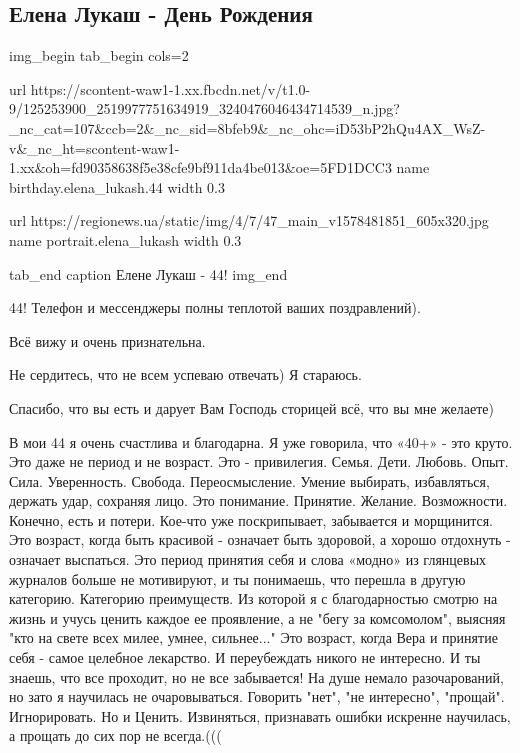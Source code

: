  
 
 

\subsection{Елена Лукаш - День Рождения}

\ifcmt
img_begin 
  tab_begin cols=2

    url https://scontent-waw1-1.xx.fbcdn.net/v/t1.0-9/125253900_2519977751634919_3240476046434714539_n.jpg?_nc_cat=107&ccb=2&_nc_sid=8bfeb9&_nc_ohc=iD53bP2hQu4AX_WsZ-v&_nc_ht=scontent-waw1-1.xx&oh=fd90358638f5e38cfe9bf911da4be013&oe=5FD1DCC3
    name birthday.elena_lukash.44
    width 0.3

    url https://regionews.ua/static/img/4/7/47_main_v1578481851_605x320.jpg
    name portrait.elena_lukash
    width 0.3

  tab_end
  caption Елене Лукаш - 44!
img_end
\fi

44!
\obeycr
Телефон и мессенджеры полны теплотой ваших поздравлений). 

Всё вижу и очень признательна.

Не сердитесь, что не всем успеваю отвечать) Я стараюсь. 

Спасибо, что вы есть и дарует Вам Господь сторицей всё, что вы мне желаете)  

В мои 44 я очень счастлива и благодарна.
Я уже говорила, что «40+» - это круто. 
Это даже не период и не возраст. 
Это - привилегия. 
Семья. Дети. Любовь. Опыт. Сила. Уверенность. Свобода. 
Переосмысление. 
Умение выбирать, избавляться, держать удар, сохраняя лицо. 
Это понимание.
Принятие. 
Желание. 
Возможности.   
Конечно, есть и потери. 
Кое-что уже поскрипывает, забывается и морщинится.
Это возраст, когда быть красивой - означает быть здоровой, а хорошо отдохнуть -  означает выспаться. 
Это период принятия себя и слова «модно» из глянцевых журналов больше не мотивируют, и ты понимаешь, что перешла в другую категорию. 
Категорию преимуществ. 
Из которой я с благодарностью  смотрю на жизнь и учусь ценить каждое ее проявление, а не "бегу за комсомолом", выясняя "кто на свете всех милее, умнее, сильнее..." 
Это возраст, когда Вера и принятие себя - самое целебное лекарство. 
И переубеждать никого не интересно. 
И ты знаешь, что все проходит, но не все забывается! 
На душе немало разочарований, но зато я научилась не очаровываться. 
Говорить "нет", "не интересно", "прощай". Игнорировать. Но и Ценить. 
Извиняться, признавать ошибки искренне научилась, а прощать до сих пор не всегда.((( 

